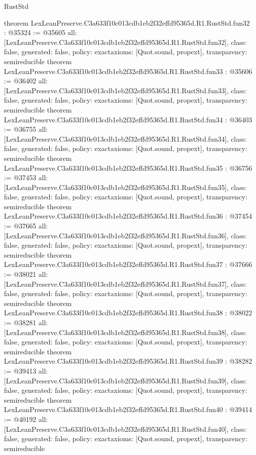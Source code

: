 \begin{lexlean}{RustStd}
\begin{coremodule}
{}
theorem LexLeanPreserve.C3a633f10c013cdb1eb2f32effd95365d.R1.RustStd.fun32 : @35324 := @35605 {
  all: [LexLeanPreserve.C3a633f10c013cdb1eb2f32effd95365d.R1.RustStd.fun32],
  class: false,
  generated: false,
  policy: exact{axioms: [Quot.sound, propext]},
  transparency: semireducible
}
theorem LexLeanPreserve.C3a633f10c013cdb1eb2f32effd95365d.R1.RustStd.fun33 : @35606 := @36402 {
  all: [LexLeanPreserve.C3a633f10c013cdb1eb2f32effd95365d.R1.RustStd.fun33],
  class: false,
  generated: false,
  policy: exact{axioms: [Quot.sound, propext]},
  transparency: semireducible
}
theorem LexLeanPreserve.C3a633f10c013cdb1eb2f32effd95365d.R1.RustStd.fun34 : @36403 := @36755 {
  all: [LexLeanPreserve.C3a633f10c013cdb1eb2f32effd95365d.R1.RustStd.fun34],
  class: false,
  generated: false,
  policy: exact{axioms: [Quot.sound, propext]},
  transparency: semireducible
}
theorem LexLeanPreserve.C3a633f10c013cdb1eb2f32effd95365d.R1.RustStd.fun35 : @36756 := @37453 {
  all: [LexLeanPreserve.C3a633f10c013cdb1eb2f32effd95365d.R1.RustStd.fun35],
  class: false,
  generated: false,
  policy: exact{axioms: [Quot.sound, propext]},
  transparency: semireducible
}
theorem LexLeanPreserve.C3a633f10c013cdb1eb2f32effd95365d.R1.RustStd.fun36 : @37454 := @37665 {
  all: [LexLeanPreserve.C3a633f10c013cdb1eb2f32effd95365d.R1.RustStd.fun36],
  class: false,
  generated: false,
  policy: exact{axioms: [Quot.sound, propext]},
  transparency: semireducible
}
theorem LexLeanPreserve.C3a633f10c013cdb1eb2f32effd95365d.R1.RustStd.fun37 : @37666 := @38021 {
  all: [LexLeanPreserve.C3a633f10c013cdb1eb2f32effd95365d.R1.RustStd.fun37],
  class: false,
  generated: false,
  policy: exact{axioms: [Quot.sound, propext]},
  transparency: semireducible
}
theorem LexLeanPreserve.C3a633f10c013cdb1eb2f32effd95365d.R1.RustStd.fun38 : @38022 := @38281 {
  all: [LexLeanPreserve.C3a633f10c013cdb1eb2f32effd95365d.R1.RustStd.fun38],
  class: false,
  generated: false,
  policy: exact{axioms: [Quot.sound, propext]},
  transparency: semireducible
}
theorem LexLeanPreserve.C3a633f10c013cdb1eb2f32effd95365d.R1.RustStd.fun39 : @38282 := @39413 {
  all: [LexLeanPreserve.C3a633f10c013cdb1eb2f32effd95365d.R1.RustStd.fun39],
  class: false,
  generated: false,
  policy: exact{axioms: [Quot.sound, propext]},
  transparency: semireducible
}
theorem LexLeanPreserve.C3a633f10c013cdb1eb2f32effd95365d.R1.RustStd.fun40 : @39414 := @40192 {
  all: [LexLeanPreserve.C3a633f10c013cdb1eb2f32effd95365d.R1.RustStd.fun40],
  class: false,
  generated: false,
  policy: exact{axioms: [Quot.sound, propext]},
  transparency: semireducible
}
\end{coremodule}
\end{lexlean}
